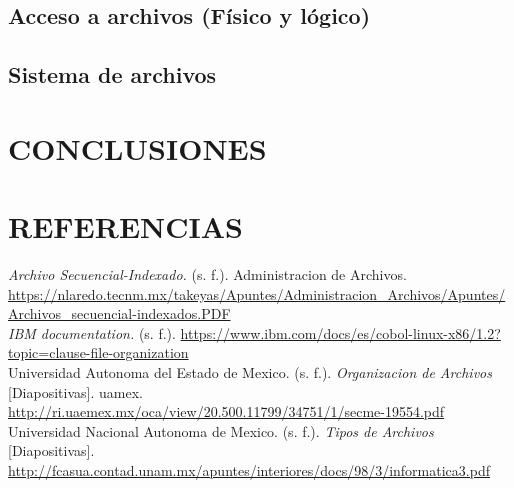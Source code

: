 \documentclass[11pt, twocolumn]{article}
\begin{document}
  \subsection{Acceso a archivos (Físico y lógico)}
  \lipsum[8-9]

  \subsection{Sistema de archivos}
  \lipsum[10-11]

  \section{CONCLUSIONES}
  \lipsum[12-13]

  \section{REFERENCIAS}
  \setlength{\parindent}{0.0cm}
  \textit{Archivo Secuencial-Indexado.} (s. f.). Administracion de Archivos. \url{https://nlaredo.tecnm.mx/takeyas/Apuntes/Administracion_Archivos/Apuntes/Archivos_secuencial-indexados.PDF} \\

  \textit{IBM documentation.} (s. f.). \url{https://www.ibm.com/docs/es/cobol-linux-x86/1.2?topic=clause-file-organization} \\

  Universidad Autonoma del Estado de Mexico. (s. f.). \textit{Organizacion de Archivos} [Diapositivas]. uamex. \url{http://ri.uaemex.mx/oca/view/20.500.11799/34751/1/secme-19554.pdf} \\

  Universidad Nacional Autonoma de Mexico. (s. f.). \textit{Tipos de Archivos} [Diapositivas]. \url{http://fcasua.contad.unam.mx/apuntes/interiores/docs/98/3/informatica3.pdf} \\
\end{document}
